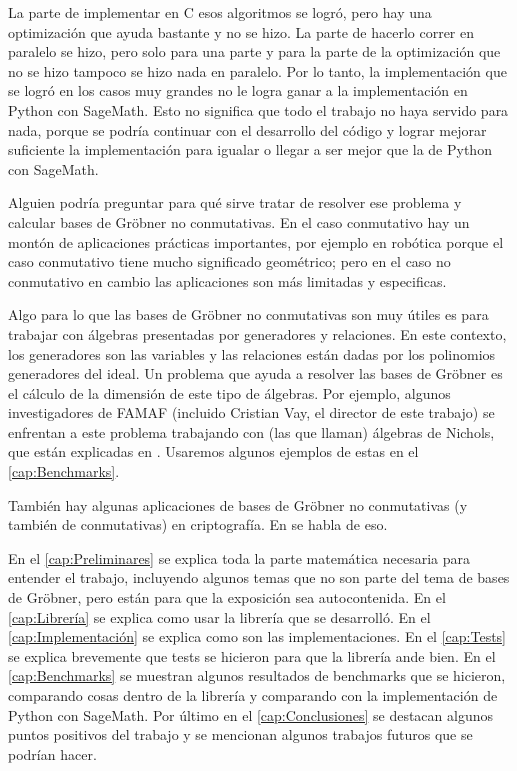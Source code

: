 \documentclass[12pt]{report}
\theoremstyle{customstyle}
\theoremstyle{factstyle}
\newcommand\cpp{C\nolinebreak[4]\hspace{-.05em}\raisebox{.4ex}{\relsize{-3}{\textbf{++}}}\xspace}
\begin{document}
La parte de implementar en \cpp esos algoritmos se logró, pero hay una optimización que ayuda bastante y no se hizo. La parte de hacerlo correr en paralelo se hizo, pero solo para una parte y para la parte de la optimización que no se hizo tampoco se hizo nada en paralelo. Por lo tanto, la implementación que se logró en los casos muy grandes no le logra ganar a la implementación en Python con SageMath. Esto no significa que todo el trabajo no haya servido para nada, porque se podría continuar con el desarrollo del código y lograr mejorar suficiente la implementación para igualar o llegar a ser mejor que la de Python con SageMath.

Alguien podría preguntar para qué sirve tratar de resolver ese problema y calcular bases de Gröbner no conmutativas. En el caso conmutativo hay un montón de aplicaciones prácticas importantes, por ejemplo en robótica porque el caso conmutativo tiene mucho significado geométrico; pero en el caso no conmutativo en cambio las aplicaciones son más limitadas y especificas.

Algo para lo que las bases de Gröbner no conmutativas son muy útiles es para trabajar con álgebras presentadas por generadores y relaciones. En este contexto, los generadores son las variables y las relaciones están dadas por los polinomios generadores del ideal. Un problema que ayuda a resolver las bases de Gröbner es el cálculo de la dimensión de este tipo de álgebras. Por ejemplo, algunos investigadores de FAMAF (incluido Cristian Vay, el director de este trabajo) se enfrentan a este problema trabajando con (las que llaman) álgebras de Nichols, que están explicadas en \cite{book:introNichols}. Usaremos algunos ejemplos de estas en el \cref{cap:Benchmarks}.

También hay algunas aplicaciones de bases de Gröbner no conmutativas (y también de conmutativas) en criptografía. En \cite{article:crypto_gb} se habla de eso.

En el \cref{cap:Preliminares} se explica toda la parte matemática necesaria para entender el trabajo, incluyendo algunos temas que no son parte del tema de bases de Gröbner, pero están para que la exposición sea autocontenida. En el \cref{cap:Librería} se explica como usar la librería que se desarrolló. En el \cref{cap:Implementación} se explica como son las implementaciones. En el \cref{cap:Tests} se explica brevemente que tests se hicieron para que la librería ande bien. En el \cref{cap:Benchmarks} se muestran algunos resultados de benchmarks que se hicieron, comparando cosas dentro de la librería y comparando con la implementación de Python con SageMath. Por último en el \cref{cap:Conclusiones} se destacan algunos puntos positivos del trabajo y se mencionan algunos trabajos futuros que se podrían hacer.
\end{document}
